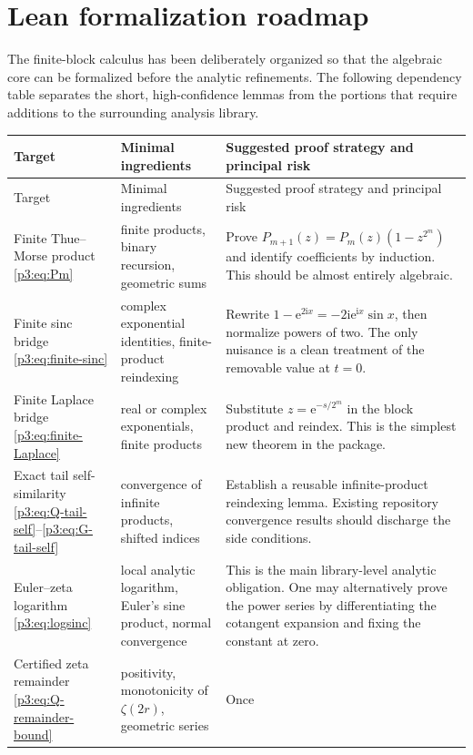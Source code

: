 \documentclass[11pt,oneside]{article}
\numberwithin{equation}{section}
\theoremstyle{definition}
\theoremstyle{remark}
\newcommand{\e}{\mathrm e}
\newcommand{\ii}{\mathrm i}
\begin{document}
\section{Lean formalization roadmap}
\label{p3:sec:formalization}

The finite-block calculus has been deliberately organized so that the algebraic core can be
formalized before the analytic refinements.  The following dependency table separates the
short, high-confidence lemmas from the portions that require additions to the surrounding
analysis library.

\begingroup
\small
\setlength{\LTleft}{0pt}
\setlength{\LTright}{0pt}
\begin{longtable}{@{}p{}p{}p{}@{}}
\toprule
Target & Minimal ingredients & Suggested proof strategy and principal risk \\
\midrule
\endfirsthead
\toprule
Target & Minimal ingredients & Suggested proof strategy and principal risk \\
\midrule
\endhead
Finite Thue--Morse product
\eqref{p3:eq:Pm} & finite products, binary recursion, geometric sums & Prove
$P_{m+1}(z)=P_m(z)(1-z^{2^m})$ and identify coefficients by induction.  This should be almost
entirely algebraic. \\
Finite sinc bridge
\eqref{p3:eq:finite-sinc} & complex exponential identities, finite-product reindexing & Rewrite
$1-\e^{2\ii x}=-2\ii\e^{\ii x}\sin x$, then normalize powers of two.  The only nuisance is a
clean treatment of the removable value at $t=0$. \\
Finite Laplace bridge
\eqref{p3:eq:finite-Laplace} & real or complex exponentials, finite products & Substitute
$z=\e^{-s/2^m}$ in the block product and reindex.  This is the simplest new theorem in the
package. \\
Exact tail self-similarity
\eqref{p3:eq:Q-tail-self}--\eqref{p3:eq:G-tail-self} & convergence of infinite products, shifted
indices & Establish a reusable infinite-product reindexing lemma.  Existing repository
convergence results should discharge the side conditions. \\
Euler--zeta logarithm
\eqref{p3:eq:logsinc} & local analytic logarithm, Euler's sine product, normal convergence & This is
the main library-level analytic obligation.  One may alternatively prove the power series by
differentiating the cotangent expansion and fixing the constant at zero. \\
Certified zeta remainder
\eqref{p3:eq:Q-remainder-bound} & positivity, monotonicity of $\zeta(2r)$, geometric series & Once

\end{longtable}
\end{document}
